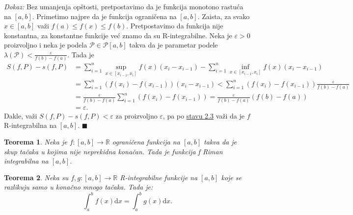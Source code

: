 \documentclass{article}
\newtheorem{teorema}{Teorema}[section]
\begin{document}
\textit{Dokaz:} Bez umanjenja opštosti, pretpostavimo da je funkcija monotono rastuća na $\left[a, b\right]$.
Primetimo najpre da je funkcija ograničena na $\left[a,b\right]$. Zaista, za svako $x \in \left[a, b\right]$ važi $f\left(a\right) \leq f\left(x\right) \leq f\left(b\right)$.
Pretpostavimo da funkcija nije konstantna, za konstantne funkcije već znamo da su R-integrabilne.
Neka je $\varepsilon > 0$ proizvoljno i neka je podela $\mathcal{P} \in \mathcal{P}\left[a, b\right]$ takva da je parametar podele
$\lambda\left(\mathcal{P}\right) < \frac{\varepsilon}{f\left(b\right) - f\left(a\right)}$. Tada je
\begin{align*}
    S\left(f, P\right) - s\left(f, P\right) & = \sum^n_{i = 1}\sup_{x\in\left[x_{i-1}, x_i\right]}f\left(x\right)\left(x_i - x_{i-1}\right) - \sum^n_{i = 1}\inf_{x\in\left[x_{i-1}, x_i\right]}f\left(x\right)\left(x_i - x_{i-1}\right)                                      \\
                                            & = \sum_{i=1}^n\left(f\left(x_i\right)-f\left(x_{i-1}\right)\right)\left(x_i - x_{i-1}\right) < \sum^n_{i=1}\left(f\left(x_i\right) - f\left(x_{i-1}\right)\right)\frac{\varepsilon}{f\left(b\right) - f\left(a\right)}           \\
                                            & = \frac{\varepsilon}{f\left(b\right) - f\left(a\right)}\sum^n_{i=1}\left(f\left(x_i\right) - f\left(x_{i-1}\right)\right) = \frac{\varepsilon}{f\left(b\right) - f\left(a\right)} \left(f\left(b\right) - f\left(a\right)\right) \\
                                            & = \varepsilon.
\end{align*}
Dakle, važi $S\left(f, P\right) - s\left(f, P\right)<\varepsilon$ za proizvoljno $\varepsilon$, pa po \hyperref[stav_2.3]{stavu 2.3} važi da je $f$
R-integrabilna na $\left[a,b\right]$.
\null\hfill $\blacksquare$\par

\begin{teoremabox}
    \label{teorema_2.5}
    \begin{teorema}
        Neka je $f:\left[a, b\right] \longrightarrow \mathbb{R}$ ograničena funkcija na $\left[a, b\right]$ takva da je skup tačaka u kojima nije neprekidna konačan. Tada je funkcija f Riman integrabilna na $\left[a, b\right]$.
    \end{teorema}
\end{teoremabox}

\begin{teoremabox}
    \label{teorema_2.6}
    \begin{teorema}
        Neka su $f, g: \left[a, b\right] \longrightarrow \mathbb{R}$ R-integrabilne funkcije na $\left[a, b\right]$ koje se razlikuju samo u konačno mnogo tačaka. Tada je:
        $$\displaystyle \int_a^b f\left(x\right)\text{d}x = \int_a^b g\left(x\right)\text{d}x.$$
    \end{teorema}
\end{teoremabox}
\end{document}
